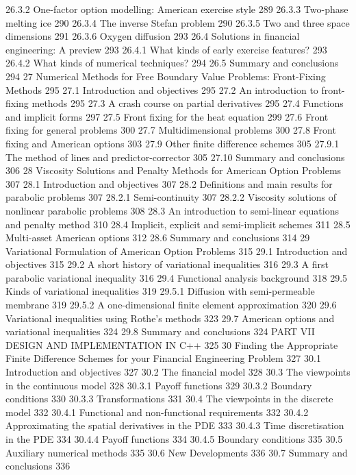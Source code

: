 26.3.2 One-factor option modelling: American exercise style 289
26.3.3 Two-phase melting ice 290
26.3.4 The inverse Stefan problem 290
26.3.5 Two and three space dimensions 291
26.3.6 Oxygen diffusion 293
26.4 Solutions in financial engineering: A preview 293
26.4.1 What kinds of early exercise features? 293
26.4.2 What kinds of numerical techniques? 294
26.5 Summary and conclusions 294
27 Numerical Methods for Free Boundary Value Problems:
Front-Fixing Methods 295
27.1 Introduction and objectives 295
27.2 An introduction to front-fixing methods 295
27.3 A crash course on partial derivatives 295
27.4 Functions and implicit forms 297
27.5 Front fixing for the heat equation 299
27.6 Front fixing for general problems 300
27.7 Multidimensional problems 300
27.8 Front fixing and American options 303
27.9 Other finite difference schemes 305
27.9.1 The method of lines and predictor-corrector 305
27.10 Summary and conclusions 306
28 Viscosity Solutions and Penalty Methods for American Option Problems 307
28.1 Introduction and objectives 307
28.2 Definitions and main results for parabolic problems 307
28.2.1 Semi-continuity 307
28.2.2 Viscosity solutions of nonlinear parabolic problems 308
28.3 An introduction to semi-linear equations and penalty method 310
28.4 Implicit, explicit and semi-implicit schemes 311
28.5 Multi-asset American options 312
28.6 Summary and conclusions 314
29 Variational Formulation of American Option Problems 315
29.1 Introduction and objectives 315
29.2 A short history of variational inequalities 316
29.3 A first parabolic variational inequality 316
29.4 Functional analysis background 318
29.5 Kinds of variational inequalities 319
29.5.1 Diffusion with semi-permeable membrane 319
29.5.2 A one-dimensional finite element approximation 320
29.6 Variational inequalities using Rothe's methods 323
29.7 American options and variational inequalities 324
29.8 Summary and conclusions 324
PART VII DESIGN AND IMPLEMENTATION IN C++ 325
30 Finding the Appropriate Finite Difference Schemes for your Financial
Engineering Problem 327
30.1 Introduction and objectives 327
30.2 The financial model 328
30.3 The viewpoints in the continuous model 328
30.3.1 Payoff functions 329
30.3.2 Boundary conditions 330
30.3.3 Transformations 331
30.4 The viewpoints in the discrete model 332
30.4.1 Functional and non-functional requirements 332
30.4.2 Approximating the spatial derivatives in the PDE 333
30.4.3 Time discretisation in the PDE 334
30.4.4 Payoff functions 334
30.4.5 Boundary conditions 335
30.5 Auxiliary numerical methods 335
30.6 New Developments 336
30.7 Summary and conclusions 336
